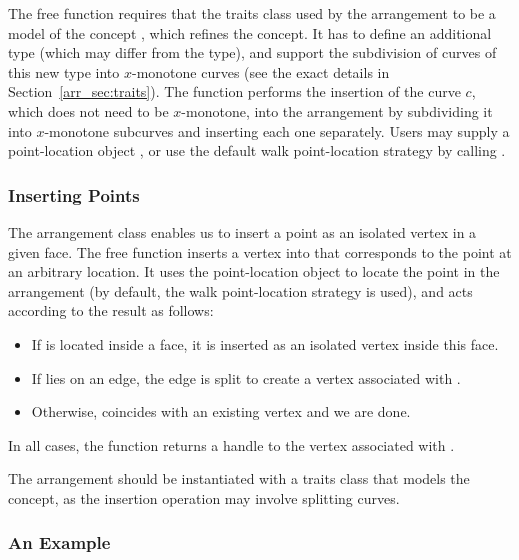 The free function  requires that the traits class
used by the arrangement  to be a model of the concept
, which refines the
 concept. It has to define an
additional  type (which may differ from the
 type), and support the subdivision of curves
of this new type into $x$-monotone curves (see the exact details in
Section~\ref{arr_sec:traits}). The 
function performs the insertion of the curve $c$, which does not need
to be $x$-monotone, into the arrangement by subdividing it into
$x$-monotone subcurves and inserting each one separately. Users
may supply a point-location object , or use the default
walk point-location strategy by calling .

\subsubsection{Inserting Points}
\label{arr_sssec:insert_point}

The arrangement class enables us to insert a point as an isolated
vertex in a given face. The free function
 inserts a vertex into  that
corresponds to the point  at an arbitrary location. It uses
the point-location object  to locate the point in the
arrangement (by default, the walk point-location strategy is used),
and acts according to the result as follows:
\begin{itemize}
\item If  is located inside a face, it is inserted as an
isolated vertex inside this face.
\item If  lies on an edge, the edge is split to create a
vertex associated with .
\item Otherwise,  coincides with an existing vertex and
we are done.
\end{itemize}
In all cases, the function returns a handle to the vertex
associated with .

The arrangement  should be instantiated with a traits class
that models the  concept, as the
insertion operation may involve splitting curves.

\subsubsection{An Example}
\label{arr_sssec:insert_ex}

